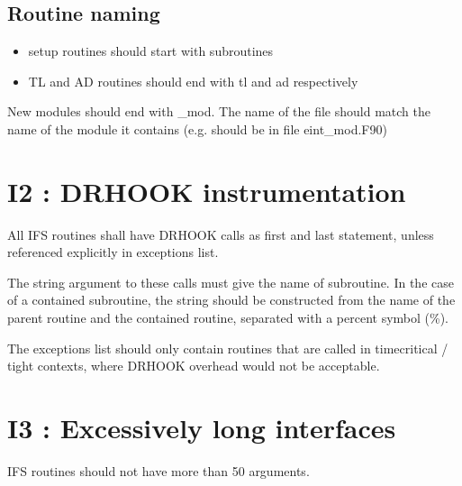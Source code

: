 \documentclass[letterpaper,10pt,english]{sphinxmanual}
\begin{document}
\subsection{Routine naming}
\label{\detokenize{rules/I1:routine-naming}}\begin{itemize}
\item {} 
\sphinxAtStartPar
setup routines should start with subroutines

\item {} 
\sphinxAtStartPar
TL and AD routines should end with tl and ad respectively

\end{itemize}

\sphinxAtStartPar
{}
New modules should end with \_mod. The name of the file should match
the name of the module it contains (e.g.  should be in file eint\_mod.F90)

\sphinxstepscope


\section{I2 : DRHOOK instrumentation}
\label{\detokenize{rules/I2:i2-drhook-instrumentation}}\label{\detokenize{rules/I2::doc}}
\sphinxAtStartPar
All IFS routines shall have DRHOOK calls as first and last statement, unless referenced
explicitly in exceptions list.

\sphinxAtStartPar
The string argument to these calls must give the name of subroutine.
In the case of a contained subroutine, the string should be constructed from the name of the
parent routine and the contained routine, separated with a percent symbol (\%).

\sphinxAtStartPar
The exceptions list should only contain routines that are called in time\sphinxhyphen{}critical / tight contexts,
where DRHOOK overhead would not be acceptable.

\sphinxstepscope


\section{I3 : Excessively long interfaces}
\label{\detokenize{rules/I3:i3-excessively-long-interfaces}}\label{\detokenize{rules/I3::doc}}
\sphinxAtStartPar
IFS routines should not have more than 50  arguments.
\end{document}
